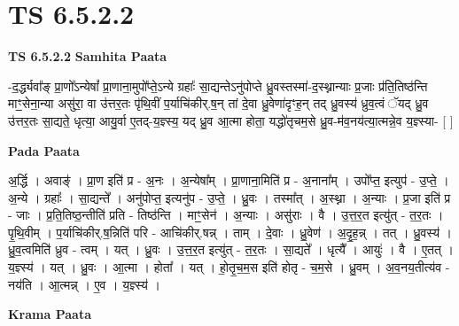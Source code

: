 \documentclass[17pt]{extarticle}
\begin{document}
\section{ TS 6.5.2.2 }

\textbf{TS 6.5.2.2 } \newline
\textbf{Samhita Paata} \newline

-द॒र्द्ध्यवा᳚ङ् प्रा॒णो᳚ऽन्येषां᳚ प्रा॒णाना॒मुपो᳚प्ते॒ऽन्ये ग्रहाः᳚ सा॒द्यन्तेऽनु॑पोप्ते ध्रु॒वस्तस्मा॑-द॒स्थ्नान्याः प्र॒जाः प्र॑ति॒तिष्ठ॑न्ति माꣳ॒॒सेना॒न्या असु॑रा॒ वा उ॑त्तर॒तः पृ॑थि॒वीं प॒र्याचि॑कीर्.ष॒न् तां दे॒वा ध्रु॒वेणा॑दृꣳह॒न् तद् ध्रु॒वस्य॑ ध्रुव॒त्वं ॅयद् ध्रु॒व उ॑त्तर॒तः सा॒द्यते॒ धृत्या॒ आयु॒र्वा ए॒तद्-य॒ज्ञ्स्य॒ यद् ध्रु॒व आ॒त्मा होता॒ यद्धो॑तृचम॒से ध्रु॒व-म॑व॒नय॑त्या॒त्मन्ने॒व य॒ज्ञ्स्या- [  ] \newline

\textbf{Pada Paata} \newline

अ॒र्द्धि । अवाङ्॑ । प्रा॒ण इति॑ प्र - अ॒नः । अ॒न्येषा᳚म् । प्रा॒णाना॒मिति॑ प्र - अ॒नाना᳚म् । उपो᳚प्त॒ इत्युप॑ - उ॒प्ते॒ । अ॒न्ये । ग्रहाः᳚ । सा॒द्यन्ते᳚ । अनु॑पोप्त॒ इत्यनु॑प - उ॒प्ते॒ । ध्रु॒वः । तस्मा᳚त् । अ॒स्थ्ना । अ॒न्याः । प्र॒जा इति॑ प्र - जाः । प्र॒ति॒तिष्ठ॒न्तीति॑ प्रति - तिष्ठ॑न्ति । माꣳ॒॒सेन॑ । अ॒न्याः । असु॑राः । वै । उ॒त्त॒र॒त इत्यु॑त् - त॒र॒तः । पृ॒थि॒वीम् । प॒र्याचि॑कीर्.ष॒न्निति॑ परि - आचि॑कीर्.षन्न् । ताम् । दे॒वाः । ध्रु॒वेण॑ । अ॒दृ॒ह॒न्न् । तत् । ध्रु॒वस्य॑ । ध्रु॒व॒त्वमिति॑ ध्रुव - त्वम् । यत् । ध्रु॒वः । उ॒त्त॒र॒त इत्यु॑त् - त॒र॒तः । सा॒द्यते᳚ । धृत्यै᳚ । आयुः॑ । वै । ए॒तत् । य॒ज्ञ्स्य॑ । यत् । ध्रु॒वः । आ॒त्मा । होता᳚ । यत् । हो॒तृ॒च॒म॒स इति॑ होतृ - च॒म॒से । ध्रु॒वम् । अ॒व॒नय॒तीत्य॑व - नय॑ति । आ॒त्मन्न् । ए॒व । य॒ज्ञ्स्य॑ ।  \newline


\textbf{Krama Paata} \newline
\end{document}
